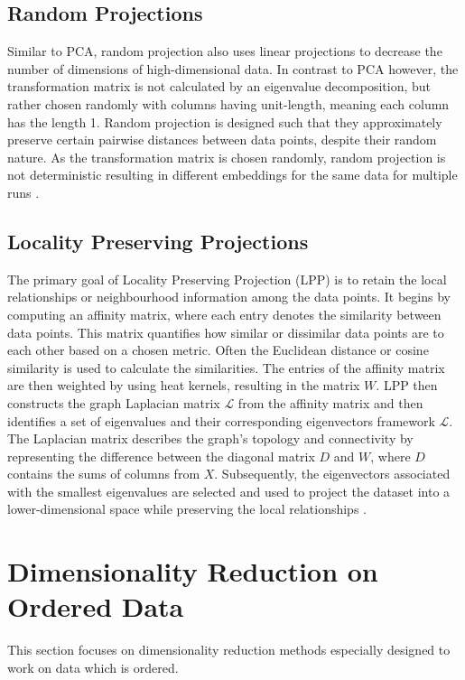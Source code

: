 \documentclass[pdftex,12pt,a4paper]{report}
\begin{document}
\subsection{Random Projections}
Similar to PCA, random projection also uses linear projections to decrease the number of dimensions of high-dimensional data.
In contrast to PCA however, the transformation matrix is not calculated by an eigenvalue decomposition, but rather chosen randomly with columns having unit-length, meaning each column has the length 1.
Random projection is designed such that they approximately preserve certain pairwise distances between data points, despite their random nature.
As the transformation matrix is chosen randomly, random projection is not deterministic resulting in different embeddings for the same data for multiple runs \cite{Random-projection}.

\subsection{Locality Preserving Projections}
The primary goal of Locality Preserving Projection (LPP) is to retain the local relationships or neighbourhood information among the data points.
It begins by computing an affinity matrix, where each entry denotes the similarity between data points.
This matrix quantifies how similar or dissimilar data points are to each other based on a chosen metric.
Often the Euclidean distance or cosine similarity is used to calculate the similarities.
The entries of the affinity matrix are then weighted by using heat kernels, resulting in the matrix $W$.
LPP then constructs the graph Laplacian matrix $\mathcal{L}$ from the affinity matrix and then identifies a set of eigenvalues and their corresponding eigenvectors framework $\mathcal{L}$.
The Laplacian matrix describes the graph's topology and connectivity by representing the difference between the diagonal matrix $D$ and $W$, where $D$ contains the sums of columns from $X$.
Subsequently, the eigenvectors associated with the smallest eigenvalues are selected and used to project the dataset into a lower-dimensional space while preserving the local relationships \cite{linear-dim-red}.

\section{Dimensionality Reduction on Ordered Data}
This section focuses on dimensionality reduction methods especially designed to work on data which is ordered.
\end{document}
